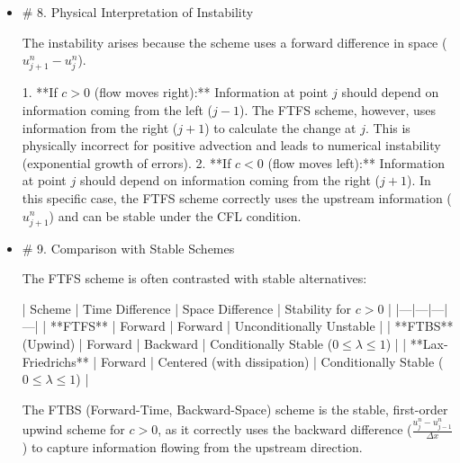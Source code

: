 \documentclass[12pt,a4paper]{report}
\begin{document}
\begin{itemize}
For the FTFS scheme applied to the advection equation $\frac{\partial u}{\partial t} + c \frac{\partial u}{\partial x} = 0$:

*   If the velocity $c$ is **positive** ($c > 0$, flow is from left to right), the scheme is **unconditionally unstable** for all values of $\lambda > 0$.
*   If the velocity $c$ is **negative** ($c < 0$, flow is from right to left), the scheme is stable only if $0 \le -\lambda \le 1$, or $0 \le c \frac{\Delta t}{\Delta x} \le 1$.

**Conclusion:** Because the FTFS scheme is unconditionally unstable for the physically relevant case of positive advection ($c>0$), it is **rarely, if ever, used** in practical computational fluid dynamics (CFD) or numerical PDE solving.

\item \# 8. Physical Interpretation of Instability

The instability arises because the scheme uses a forward difference in space ($u_{j+1}^n - u_j^n$).

1.  **If $c > 0$ (flow moves right):** Information at point $j$ should depend on information coming from the left ($j-1$). The FTFS scheme, however, uses information from the right ($j+1$) to calculate the change at $j$. This is physically incorrect for positive advection and leads to numerical instability (exponential growth of errors).
2.  **If $c < 0$ (flow moves left):** Information at point $j$ should depend on information coming from the right ($j+1$). In this specific case, the FTFS scheme correctly uses the upstream information ($u_{j+1}^n$) and can be stable under the CFL condition.

\item \# 9. Comparison with Stable Schemes

The FTFS scheme is often contrasted with stable alternatives:

| Scheme | Time Difference | Space Difference | Stability for $c>0$ |
|---|---|---|---|
| **FTFS** | Forward | Forward | Unconditionally Unstable |
| **FTBS** (Upwind) | Forward | Backward | Conditionally Stable ($0 \le \lambda \le 1$) |
| **Lax-Friedrichs** | Forward | Centered (with dissipation) | Conditionally Stable ($0 \le \lambda \le 1$) |

The FTBS (Forward-Time, Backward-Space) scheme is the stable, first-order upwind scheme for $c>0$, as it correctly uses the backward difference ($\frac{u_j^n - u_{j-1}^n}{\Delta x}$) to capture information flowing from the upstream direction.


\end{itemize}
\end{document}
